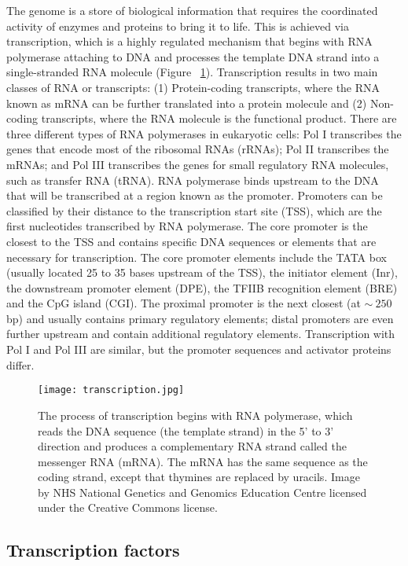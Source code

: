 The genome is a store of biological information that requires the coordinated activity of enzymes and proteins to bring it to life. This is achieved via transcription, which is a highly regulated mechanism that begins with RNA polymerase attaching to DNA and processes the template DNA strand into a single-stranded RNA molecule (Figure ~\ref{fig:transcription}). Transcription results in two main classes of RNA or transcripts: (1) Protein-coding transcripts, where the RNA known as mRNA can be further translated into a protein molecule and (2) Non-coding transcripts, where the RNA molecule is the functional product. There are three different types of RNA polymerases in eukaryotic cells: Pol I transcribes the genes that encode most of the ribosomal RNAs (rRNAs); Pol II transcribes the mRNAs; and Pol III transcribes the genes for small regulatory RNA molecules, such as transfer RNA (tRNA). RNA polymerase binds upstream to the DNA that will be transcribed at a region known as the promoter. Promoters can be classified by their distance to the transcription start site (TSS), which are the first nucleotides transcribed by RNA polymerase. The core promoter is the closest to the TSS and contains specific DNA sequences or elements that are necessary for transcription. The core promoter elements include the TATA box (usually located 25 to 35 bases upstream of the TSS), the initiator element (Inr), the downstream promoter element (DPE), the TFIIB recognition element (BRE) and the CpG island (CGI). The proximal promoter is the next closest (at $\sim~250$ bp) and usually contains primary regulatory elements; distal promoters are even further upstream and contain additional regulatory elements. Transcription with Pol I and Pol III are similar, but the promoter sequences and activator proteins differ.

\begin{figure}[!ht]
   \centering
   \texttt{[image: transcription.jpg]}
   \caption[DNA transcription]{The process of transcription begins with RNA polymerase, which reads the DNA sequence (the template strand) in the 5' to 3' direction and produces a complementary RNA strand called the messenger RNA (mRNA). The mRNA has the same sequence as the coding strand, except that thymines are replaced by uracils. Image by NHS National Genetics and Genomics Education Centre licensed under the Creative Commons license.}
   \label{fig:transcription}
\end{figure}

\subsection{Transcription factors}


